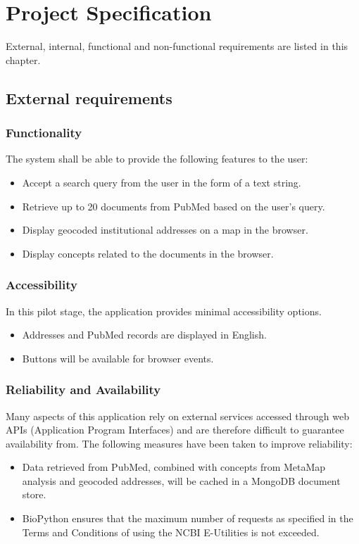 \documentclass[Report.tex]{subfiles}
\begin{document}
\chapter{Project Specification}
External, internal, functional and non-functional requirements are listed in this chapter. 

\section{External requirements}
\subsection{Functionality}
The system shall be able to provide the following features to the user:
\begin{itemize}
\item Accept a search query from the user in the form of a text string.
\item Retrieve up to 20 documents from PubMed based on the user's query.
\item Display geocoded institutional addresses on a map in the browser.
\item Display concepts related to the documents in the browser.
\end{itemize}

\subsection{Accessibility}
In this pilot stage, the application provides minimal accessibility options. 
\begin{itemize}
\item Addresses and PubMed records are displayed in English.
\item Buttons will be available for browser events.
\end{itemize}

\subsection{Reliability and Availability}
Many aspects of this application rely on external services accessed through web APIs (Application Program Interfaces) and are therefore difficult to guarantee availability from. The following measures have been taken to improve reliability:
\begin{itemize}
\item Data retrieved from PubMed, combined with concepts from MetaMap analysis and geocoded addresses, will be cached in a MongoDB document store.
\item BioPython ensures that the maximum number of requests as specified in the Terms and Conditions of using the NCBI E-Utilities\cite{} is not exceeded.
\end{itemize}
\end{document}
